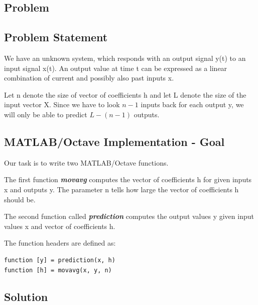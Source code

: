 \documentclass{article}
\begin{document}
\begin{flushleft}
\section{Problem}
\subsection{Problem Statement}
\vspace{2mm}
We have an unknown system, which responds with an output signal y(t) to an input signal x(t). An output value at time t can be expressed as a linear combination of current and possibly also past inputs x.\par
\vspace{4mm} 
Let n denote the size of vector of coefficients h and let L denote the size of the input vector X. Since we have to look \begin{math}n-1\end{math} inputs back for each output y, we will only be able to predict \begin{math}L-(n-1)\end{math} outputs.
\subsection{MATLAB/Octave Implementation - Goal}
\vspace{2mm}
Our task is to write two MATLAB/Octave functions.\par \vspace{4mm} The first function \textbf{\textit{movavg}} computes the vector of coefficients h for given inputs x and outputs y. The parameter n tells how large the vector of coefficients h should be. \par \vspace{4mm}
The second function called \textbf{\textit{prediction}} computes the output values y given input values x and vector of coefficients h.

The function headers are defined as:
\begin{large}
\begin{verbatim}
function [y] = prediction(x, h)
function [h] = movavg(x, y, n)
\end{verbatim}
\end{large}
\end{flushleft}
\vspace{2mm}
\begin{flushleft}
\section{Solution}
\end{flushleft}
\end{document}

